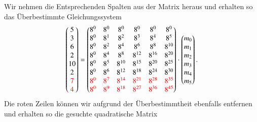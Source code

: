 Wir nehmen die Entsprechenden Spalten aus der Matrix heraus und erhalten so das Überbestimmte Gleichungssystem
\[
\begin{pmatrix}
	5 \\ 3 \\ 6 \\ 2 \\ 10 \\ 2 \\ \textcolor{red}{7} \\ \textcolor{red}{4} \\
\end{pmatrix}
=
\begin{pmatrix}
	8^0&    8^0&    8^0&    8^0&    8^0&    8^0\\
	8^0&	8^1&	8^2&	8^3&	8^4&	8^5\\
	8^0&	8^2&	8^4&	8^6&	8^8& 8^{10}\\
	8^0&	8^4&	8^8& 8^{12}& 8^{16}& 8^{20}\\
	8^0&	8^5& 8^{10}& 8^{15}& 8^{20}& 8^{25}\\
	8^0&	8^6& 8^{12}& 8^{18}& 8^{24}& 8^{30}\\
	\textcolor{red}{8^0}&	\textcolor{red}{8^7}& \textcolor{red}{8^{14}}& \textcolor{red}{8^{21}}& \textcolor{red}{8^{28}}& \textcolor{red}{8^{35}}\\
	\textcolor{red}{8^0}&	\textcolor{red}{8^9}& \textcolor{red}{8^{18}}& \textcolor{red}{8^{27}}& \textcolor{red}{8^{36}}& \textcolor{red}{8^{45}}\\
\end{pmatrix}
\cdot
\begin{pmatrix}
	m_0 \\ m_1 \\ m_2 \\ m_3 \\ m_4 \\ m_5 \\
\end{pmatrix}
.
\]
Die roten Zeilen können wir aufgrund der Überbestimmtheit ebenfalls entfernen und erhalten so die gesuchte quadratische Matrix
